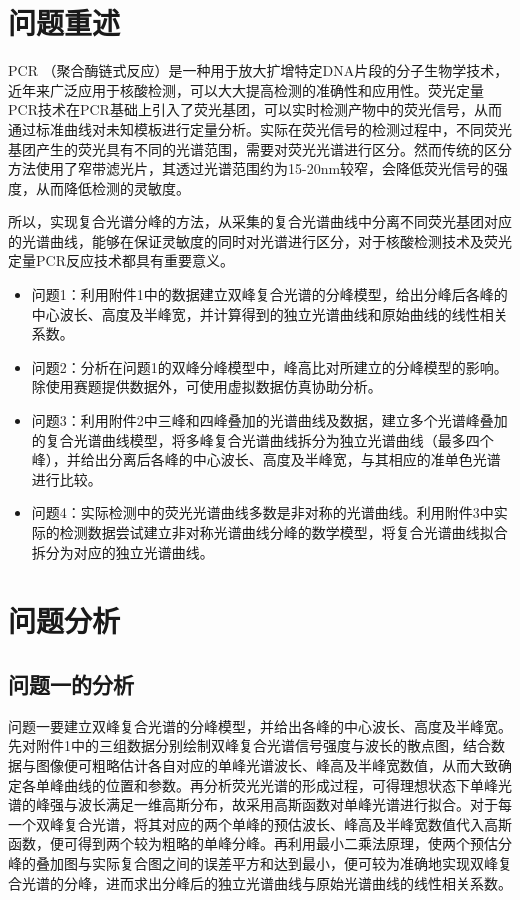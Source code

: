 \documentclass{article}
\numberwithin{equation}{subsection}
\begin{document}
\newpage





{\centering\section{问题重述}}
PCR （聚合酶链式反应）是一种用于放大扩增特定DNA片段的分子生物学技术，近年来广泛应用于核酸检测，可以大大提高检测的准确性和应用性。荧光定量PCR技术在PCR基础上引入了荧光基团，可以实时检测产物中的荧光信号，从而通过标准曲线对未知模板进行定量分析。实际在荧光信号的检测过程中，不同荧光基团产生的荧光具有不同的光谱范围，需要对荧光光谱进行区分。然而传统的区分方法使用了窄带滤光片，其透过光谱范围约为15-20nm较窄，会降低荧光信号的强度，从而降低检测的灵敏度。

所以，实现复合光谱分峰的方法，从采集的复合光谱曲线中分离不同荧光基团对应的光谱曲线，能够在保证灵敏度的同时对光谱进行区分，对于核酸检测技术及荧光定量PCR反应技术都具有重要意义。

\begin{itemize}
    \item 问题1：利用附件1中的数据建立双峰复合光谱的分峰模型，给出分峰后各峰的中心波长、高度及半峰宽，并计算得到的独立光谱曲线和原始曲线的线性相关系数。
    \item 问题2：分析在问题1的双峰分峰模型中，峰高比对所建立的分峰模型的影响。除使用赛题提供数据外，可使用虚拟数据仿真协助分析。
    \item 问题3：利用附件2中三峰和四峰叠加的光谱曲线及数据，建立多个光谱峰叠加的复合光谱曲线模型，将多峰复合光谱曲线拆分为独立光谱曲线（最多四个峰），并给出分离后各峰的中心波长、高度及半峰宽，与其相应的准单色光谱进行比较。
    \item 问题4：实际检测中的荧光光谱曲线多数是非对称的光谱曲线。利用附件3中实际的检测数据尝试建立非对称光谱曲线分峰的数学模型，将复合光谱曲线拟合拆分为对应的独立光谱曲线。
\end{itemize}



{\centering\section{问题分析}}

\subsection{问题一的分析}
问题一要建立双峰复合光谱的分峰模型，并给出各峰的中心波长、高度及半峰宽。先对附件1中的三组数据分别绘制双峰复合光谱信号强度与波长的散点图，结合数据与图像便可粗略估计各自对应的单峰光谱波长、峰高及半峰宽数值，从而大致确定各单峰曲线的位置和参数。再分析荧光光谱的形成过程，可得理想状态下单峰光谱的峰强与波长满足一维高斯分布，故采用高斯函数对单峰光谱进行拟合。对于每一个双峰复合光谱，将其对应的两个单峰的预估波长、峰高及半峰宽数值代入高斯函数，便可得到两个较为粗略的单峰分峰。再利用最小二乘法原理，使两个预估分峰的叠加图与实际复合图之间的误差平方和达到最小，便可较为准确地实现双峰复合光谱的分峰，进而求出分峰后的独立光谱曲线与原始光谱曲线的线性相关系数。
\end{document}
